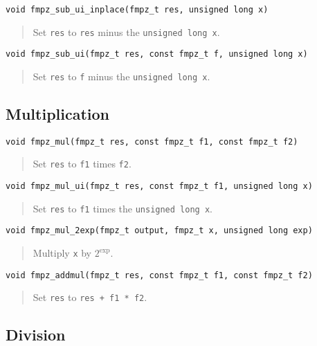 \documentclass[a4paper,10pt]{article}
\newcommand{\code}{\lstinline}
\begin{document}
\begin{lstlisting}
void fmpz_sub_ui_inplace(fmpz_t res, unsigned long x)
\end{lstlisting}
\begin{quote}
Set \code{res} to \code{res} minus the \code{unsigned long x}.
\end{quote}

\begin{lstlisting}
void fmpz_sub_ui(fmpz_t res, const fmpz_t f, unsigned long x)
\end{lstlisting}
\begin{quote}
Set \code{res} to \code{f} minus the \code{unsigned long x}.
\end{quote}

\subsection{Multiplication}

\begin{lstlisting}
void fmpz_mul(fmpz_t res, const fmpz_t f1, const fmpz_t f2)
\end{lstlisting}
\begin{quote}
Set \code{res} to \code{f1} times \code{f2}.
\end{quote}

\begin{lstlisting}
void fmpz_mul_ui(fmpz_t res, const fmpz_t f1, unsigned long x)
\end{lstlisting}
\begin{quote}
Set \code{res} to \code{f1} times the \code{unsigned long x}.
\end{quote}

\begin{lstlisting}
void fmpz_mul_2exp(fmpz_t output, fmpz_t x, unsigned long exp)
\end{lstlisting}
\begin{quote}
Multiply \code{x} by $2^{\mbox{exp}}$.
\end{quote}

\begin{lstlisting}
void fmpz_addmul(fmpz_t res, const fmpz_t f1, const fmpz_t f2)
\end{lstlisting}
\begin{quote}
Set \code{res} to \code{res + f1 * f2}.
\end{quote}

\subsection{Division}
\end{document}
